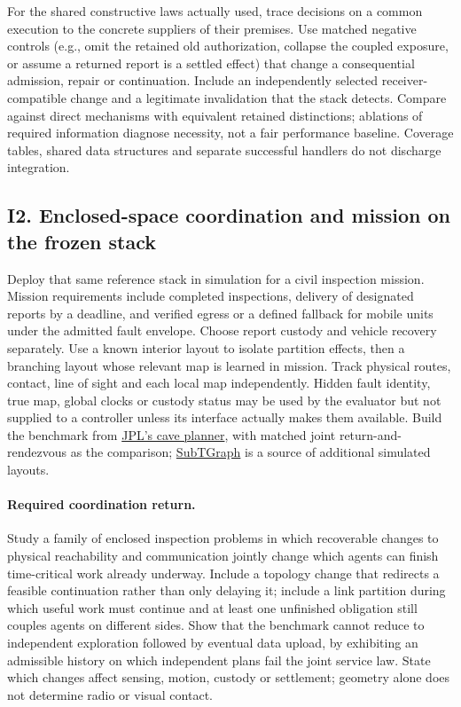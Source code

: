 \documentclass[11pt]{article}
\begin{document}
For the shared constructive laws actually used, trace decisions on a common execution to the concrete suppliers of their premises. Use matched negative controls (e.g., omit the retained old authorization, collapse the coupled exposure, or assume a returned report is a settled effect) that change a consequential admission, repair or continuation. Include an independently selected receiver-compatible change and a legitimate invalidation that the stack detects. Compare against direct mechanisms with equivalent retained distinctions; ablations of required information diagnose necessity, not a fair performance baseline. Coverage tables, shared data structures and separate successful handlers do not discharge integration.

\subsection*{I2. Enclosed-space coordination and mission on the frozen stack}
Deploy that same reference stack in simulation for a civil inspection mission. Mission requirements include completed inspections, delivery of designated reports by a deadline, and verified egress or a defined fallback for mobile units under the admitted fault envelope. Choose report custody and vehicle recovery separately. Use a known interior layout to isolate partition effects, then a branching layout whose relevant map is learned in mission. Track physical routes, contact, line of sight and each local map independently. Hidden fault identity, true map, global clocks or custody status may be used by the evaluator but not supplied to a controller unless its interface actually makes them available. Build the benchmark from \href{https://superintelligence.jpl.nasa.gov/public/documents/papers/PlanRob-2020-Planning-and-Optimization-for-Multi-Robot-Planetary-Cave-Exploration.pdf}{JPL's cave planner}, with matched joint return-and-rendezvous as the comparison; \href{https://arxiv.org/abs/2605.20917}{SubTGraph} is a source of additional simulated layouts.

\paragraph{Required coordination return.} Study a family of enclosed inspection problems in which recoverable changes to physical reachability and communication jointly change which agents can finish time-critical work already underway. Include a topology change that redirects a feasible continuation rather than only delaying it; include a link partition during which useful work must continue and at least one unfinished obligation still couples agents on different sides. Show that the benchmark cannot reduce to independent exploration followed by eventual data upload, by exhibiting an admissible history on which independent plans fail the joint service law. State which changes affect sensing, motion, custody or settlement; geometry alone does not determine radio or visual contact.
\end{document}
